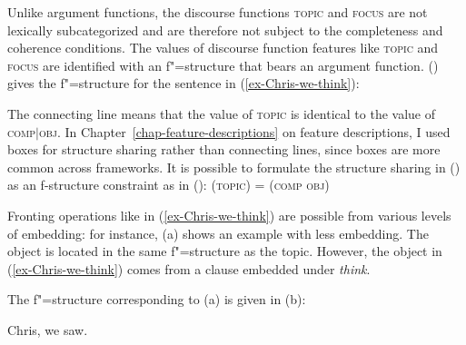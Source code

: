 Unlike argument functions, the discourse functions  \textsc{topic} and
\textsc{focus} are not lexically subcategorized and are therefore not
subject to the completeness and coherence conditions. The values of
discourse function features like \textsc{topic} and \textsc{focus} are identified with an
f"=structure that bears an argument function.  () gives the f"=structure for the sentence in
(\ref{ex-Chris-we-think}): 

\ea
{}
\z

\noindent
The connecting line means that the value of \textsc{topic} is identical to the value of
\textsc{comp$|$obj}. In Chapter~\ref{chap-feature-descriptions} on feature descriptions, I used boxes for structure sharing
rather than connecting lines, since boxes are more common across frameworks.
It is possible to formulate the structure sharing in () as an f-structure constraint as in ():
\ea
\label{Topic-Comp-Obj}
(\upsp  \textsc{topic}) = (\upsp \textsc{comp obj})
\z

\noindent
Fronting operations like in (\ref{ex-Chris-we-think}) are possible from various levels of embedding:
for instance, (a) shows an example with less embedding.
The object is located in the same f"=structure as the topic. However, the object in (\ref{ex-Chris-we-think}) comes from a clause embedded under \emph{think}.

The f"=structure corresponding to (a) is given in (b):

\eal
\ex Chris, we saw.
\ex 
{}
\zl


